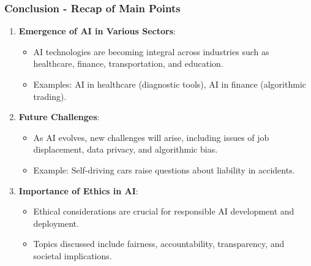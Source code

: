\documentclass[aspectratio=169]{beamer}
\begin{document}
\begin{frame}[fragile]
    \frametitle{Conclusion - Recap of Main Points}
    \begin{enumerate}
        \item \textbf{Emergence of AI in Various Sectors}:
        \begin{itemize}
            \item AI technologies are becoming integral across industries such as healthcare, finance, transportation, and education.
            \item Examples: AI in healthcare (diagnostic tools), AI in finance (algorithmic trading).
        \end{itemize}
        
        \item \textbf{Future Challenges}:
        \begin{itemize}
            \item As AI evolves, new challenges will arise, including issues of job displacement, data privacy, and algorithmic bias.
            \item Example: Self-driving cars raise questions about liability in accidents.
        \end{itemize}
        
        \item \textbf{Importance of Ethics in AI}:
        \begin{itemize}
            \item Ethical considerations are crucial for responsible AI development and deployment.
            \item Topics discussed include fairness, accountability, transparency, and societal implications.
        \end{itemize}
    \end{enumerate}
\end{frame}
\end{document}
